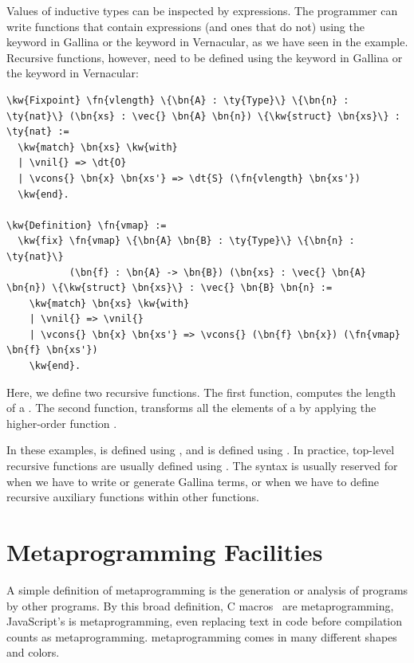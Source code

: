 Values of \gls{inductive type}s can be inspected by  expressions. The programmer can write functions that contain  expressions (and ones that do not) using the  keyword in \gls{Gallina} or the  keyword in \gls{Vernacular}, as we have seen in the \listsum{} example. Recursive functions, however, need to be defined using the  keyword in \gls{Gallina} or the  keyword in \gls{Vernacular}:

\begin{Verbatim}
\kw{Fixpoint} \fn{vlength} \{\bn{A} : \ty{Type}\} \{\bn{n} : \ty{nat}\} (\bn{xs} : \vec{} \bn{A} \bn{n}) \{\kw{struct} \bn{xs}\} : \ty{nat} :=
  \kw{match} \bn{xs} \kw{with}
  | \vnil{} => \dt{O}
  | \vcons{} \bn{x} \bn{xs'} => \dt{S} (\fn{vlength} \bn{xs'})
  \kw{end}.

\kw{Definition} \fn{vmap} :=
  \kw{fix} \fn{vmap} \{\bn{A} \bn{B} : \ty{Type}\} \{\bn{n} : \ty{nat}\} 
           (\bn{f} : \bn{A} -> \bn{B}) (\bn{xs} : \vec{} \bn{A} \bn{n}) \{\kw{struct} \bn{xs}\} : \vec{} \bn{B} \bn{n} :=
    \kw{match} \bn{xs} \kw{with}
    | \vnil{} => \vnil{}
    | \vcons{} \bn{x} \bn{xs'} => \vcons{} (\bn{f} \bn{x}) (\fn{vmap} \bn{f} \bn{xs'})
    \kw{end}.
\end{Verbatim}

Here, we define two recursive functions. The first function,  computes the length of a \vec{}. The second function,  transforms all the elements of a \vec{} by applying the higher-order function .

In these examples,  is defined using , and  is defined using . In practice, top-level recursive functions are usually defined using . The  syntax is usually reserved for when we have to write or generate \gls{Gallina} terms, or when we have to define recursive auxiliary functions within other functions.

\section{Metaprogramming Facilities}

A simple definition of \gls{metaprogramming} is the generation or analysis of programs by other programs. By this broad definition, C macros~\cite{stallman1987c} are \gls{metaprogramming}, JavaScript's  is \gls{metaprogramming}, even replacing text in code before compilation counts as \gls{metaprogramming}. \Gls{metaprogramming} comes in many different shapes and colors. 

